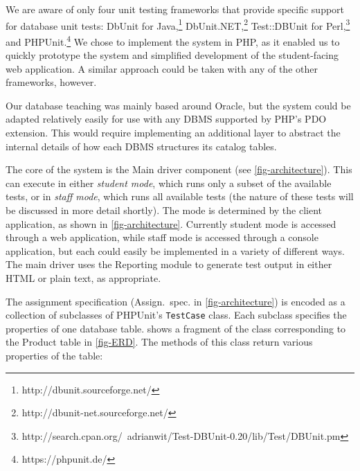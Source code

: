 \documentclass[sigconf, authordraft, capitalise]{acmart}
\begin{document}
We are aware of only four unit testing frameworks that provide specific support for database unit tests: DbUnit for Java,\footnote{http://dbunit.sourceforge.net/} DbUnit.NET,\footnote{http://dbunit-net.sourceforge.net/} Test::DBUnit for Perl,\footnote{http://search.cpan.org/~adrianwit/Test-DBUnit-0.20/lib/Test/DBUnit.pm} and PHPUnit.\footnote{https://phpunit.de/} We chose to implement the system in PHP, as it enabled us to quickly prototype the system and simplified development of the student-facing web application. A similar approach could be taken with any of the other frameworks, however.

Our database teaching was mainly based around Oracle, but the system could be adapted relatively easily for use with any DBMS supported by PHP's PDO extension. This would require implementing an additional layer to abstract the internal details of how each DBMS structures its catalog tables.

The core of the system is the \textsf{Main driver} component (see \cref{fig-architecture}). This can execute in either \emph{student mode}, which runs only a subset of the available tests, or in \emph{staff mode}, which runs all available tests (the nature of these tests will be discussed in more detail shortly). The mode is determined by the client application, as shown in \cref{fig-architecture}. Currently student mode is accessed through a web application, while staff mode is accessed through a console application, but each could easily be implemented in a variety of different ways. The main driver uses the \textsf{Reporting} module to generate test output in either HTML or plain text, as appropriate.

The assignment specification (\textsf{Assign.\ spec.} in \cref{fig-architecture}) is encoded as a collection of subclasses of PHPUnit's \texttt{TestCase} class. Each subclass specifies the properties of one database table.  shows a fragment of the class corresponding to the \textsf{Product} table in \cref{fig-ERD}. The methods of this class return various properties of the table:
\end{document}
